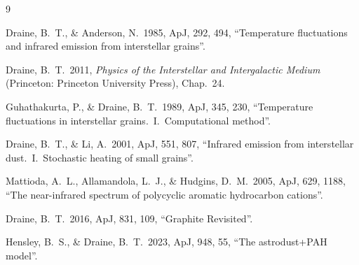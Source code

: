 \documentclass{my_memo}
\begin{document}

\begin{thebibliography}{9}

Draine, B.~T., \& Anderson, N.\ 1985, ApJ, 292, 494,
``Temperature fluctuations and infrared emission from interstellar
grains''.

Draine, B.~T.\ 2011, \emph{Physics of the Interstellar and
Intergalactic Medium} (Princeton: Princeton University Press), Chap.\ 24.

Guhathakurta, P., \& Draine, B.~T.\ 1989, ApJ, 345, 230,
``Temperature fluctuations in interstellar grains.\ I.\ Computational
method''.

Draine, B.~T., \& Li, A.\ 2001, ApJ, 551, 807,
``Infrared emission from interstellar dust.\ I.\ Stochastic heating
of small grains''.

Mattioda, A.~L., Allamandola, L.~J., \& Hudgins, D.~M.\ 2005, ApJ,
629, 1188, ``The near-infrared spectrum of polycyclic aromatic
hydrocarbon cations''.

Draine, B.~T.\ 2016, ApJ, 831, 109, ``Graphite Revisited''.

Hensley, B.~S., \& Draine, B.~T.\ 2023, ApJ, 948, 55,
``The astrodust+PAH model''.

\end{thebibliography}
\end{document}
